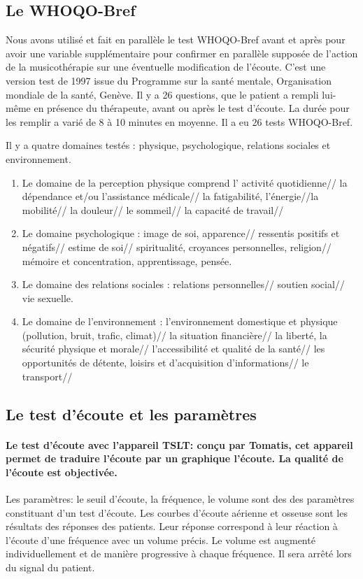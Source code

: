 \subsection{Le WHOQO-Bref}

Nous avons utilisé et fait en parallèle le test WHOQO-Bref avant et
après pour avoir une variable supplémentaire pour confirmer en
parallèle supposée de l'action de la musicothérapie sur une éventuelle modification de l'écoute.  C'est une
version test de 1997 issue du Programme sur la santé mentale,
Organisation mondiale de la santé, Genève. Il y a 26 questions, que le
patient a rempli lui-même en présence du thérapeute, avant ou après le test
d'écoute. La durée pour les remplir a varié de 8 à 10 minutes en
moyenne.  Il a eu 26 tests WHOQO-Bref.

Il y a quatre domaines testés : physique, psychologique, relations sociales et environnement.
\begin{enumerate}
	\item  Le domaine de la perception physique comprend l' activité quotidienne// la dépendance et/ou l'assistance médicale// la fatigabilité, l'énergie//la mobilité// la douleur// le sommeil// la capacité de travail//
	
		 \item Le domaine psychologique :  image de soi, apparence// ressentis positifs et négatifs// estime de soi// spiritualité, croyances personnelles, religion// mémoire et concentration, apprentissage, pensée.
		
			\item Le domaine des relations sociales : relations personnelles// soutien social// vie sexuelle.
			
			\item Le domaine de l'environnement : l'environnement domestique et  physique (pollution, bruit, trafic, climat)// la situation financière//  la liberté, la sécurité physique et morale// l'accessibilité et qualité de la santé// les opportunités de détente, loisirs et d'acquisition d'informations// le transport// 
		\end{enumerate}
		
	


 \subsection{Le test d'écoute et les paramètres} 	
 
 \paragraph{Le test d'écoute avec l'appareil TSLT: conçu par Tomatis,
   cet appareil permet de traduire l'écoute par 
   un graphique l'écoute. La
   qualité de l'écoute est objectivée.} 
 Les paramètres: le seuil d'écoute, la fréquence, le volume sont des
 des paramètres 
 constituant d'un test d'écoute. Les courbes
 d'écoute aérienne et osseuse sont les résultats des
 réponses des patients. Leur réponse correspond à leur réaction à l'écoute d'une
 fréquence avec un volume précis.
 Le volume est augmenté individuellement et de manière progressive à
 chaque fréquence. Il sera arrêté lors du signal du patient. 
 
